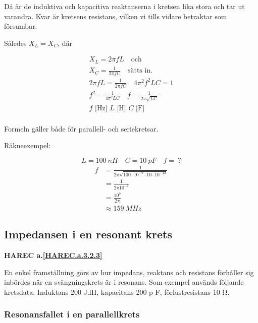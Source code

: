 Då är de induktiva och kapacitiva reaktanserna i kretsen lika stora och tar ut
varandra. Kvar är kretsens resistans, vilken vi tills vidare betraktar som
försumbar.

Således \(X_L = X_C\), där

\begin{gather*}
  X_L = 2πfL \quad \text{och} \\
  X_C = \frac{1}{2πfC} \quad \text{sätts in.} \\
  2πfL = \frac{1}{2πfC} \quad 4π^2f^2LC = 1 \\
  f^2 = \frac{1}{4π^2LC} \quad f = \frac{1}{2π\sqrt{LC}} \\
  f\text{ [Hz] }L\text{ [H] }C\text{ [F] } \\
\end{gather*}

Formeln gäller både för parallell- och seriekretsar.

Räkneexempel:

\[L = 100\ nH \quad C = 10\ pF \quad f =\ ?\]
\begin{align*}
  f &= \frac{1}{2π\sqrt{100 \cdot 10^{-9} \cdot 10 \cdot 10^{-12}}} \\
  &= \frac{1}{2π10^{-1}} \\
  &= \frac{10^9}{2π} \\
  &\approx 159\ MHz
\end{align*}

\subsection{Impedansen i en resonant krets}
\textbf{HAREC a.\ref{HAREC.a.3.2.3}\label{myHAREC.a.3.2.3}}

En enkel framställning görs av hur impedans, reaktans och resistans förhåller
sig inbördes när en svängningskrets är i resonans. Som exempel används följande
kretsdata: Induktans 200 J.lH, kapacitans 200 p F, förlustresistans 10 Ω.

\subsubsection{Resonansfallet i en parallellkrets}
\label{parallellresonans}

